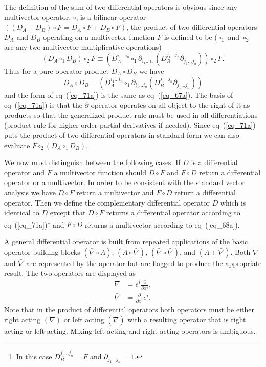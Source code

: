 \documentclass[12pt,twoside,openright]{memoir}
\newcommand{\bfrac}[2]{\displaystyle\frac{#1}{#2}}
\newcommand{\lp}{\left (}
\newcommand{\rp}{\right )}
\newcommand{\pdiff}[2]{\bfrac{\partial {#1}}{\partial {#2}}}
\newcommand{\paren}[1]{\lp {#1} \rp}
\newcommand{\be}{\begin{equation}}
\newcommand{\ee}{\end{equation}}
\begin{document}
The definition of the sum of two differential operators is obvious since any multivector operator, $\circ$, is a bilinear operator 
$\paren{\paren{D_{A}+D_{B}}\circ F = D_{A}\circ F+D_{B}\circ F}$, the product of two differential operators $D_{A}$ and $D_{B}$ operating on a multivector function $F$ is defined to be ($\circ_{1}$ and $\circ_{2}$ are any two multivector multiplicative operations)
\be
	\paren{D_{A}\circ_{1}D_{B}}\circ_{2}F \equiv \paren{D_{A}^{i_{1}\dots i_{n}}\circ_{1}
	                                              \partial_{i_{1}\dots i_{n}}\paren{D_{B}^{j_{1}\dots j_{n}}
	                                              \partial_{j_{1}\dots j_{n}}}}\circ_{2}F.
\ee
Thus for a pure operator product $D_{A}\circ D_{B}$ we have
\be\label{eq_71a}
	D_{A}\circ D_{B} = \paren{D_{A}^{i_{1}\dots i_{n}}\circ_{1}
	                                              \partial_{i_{1}\dots i_{n}}\paren{D_{B}^{j_{1}\dots j_{n}}
	                                              \partial_{j_{1}\dots j_{n}}}}
\ee
and the form of eq~(\ref{eq_71a}) is the same as eq~(\ref{eq_67a}).  The basis of eq~(\ref{eq_71a}) is that the $\partial$ operator
operates on all object to the right of it as products so that the generalized product rule must be used in all differentiations (product 
rule for higher order partial derivatives if needed).  Since eq~(\ref{eq_71a})
puts the product of two differential operators in standard form we can also evaluate $F\circ_{2}\paren{D_{A}\circ_{1}D_{B}}$.

We now must distinguish between the following cases.  If $D$ is a differential operator and $F$ a multivector function should $D\circ F$ and
$F\circ D$ return a differential operator or a multivector. In order to be consistent with the standard vector analysis we have $D\circ F$ 
return a multivector and $F\circ D$ return a differential operator.  Then we define the complementary differential operator $\bar{D}$ which
is identical to $D$ except that $\bar{D}\circ F$ returns a differential operator according to eq~(\ref{eq_71a})\footnote{In this case
$D_{B}^{j_{1}\dots j_{n}} = F$ and $\partial_{j_{1}\dots j_{n}} = 1$.} and $F\circ\bar{D}$ returns a multivector according to eq~(\ref{eq_68a}). 

A general differential operator is built from repeated applications of the basic operator building blocks $\paren{\bar{\nabla}\circ A}$,
$\paren{A\circ\bar{\nabla}}$, $\paren{\bar{\nabla}\circ\bar{\nabla}}$, and $\paren{A\pm \bar{\nabla}}$.  Both $\nabla$ and  $\bar{\nabla}$
are represented by the operator but are flagged to produce the appropriate result.  The two operators are displayed as
\begin{align}
	\nabla  &= e^{i}\pdiff{}{x^{i}}, \\
	\bar{\nabla}  &= \pdiff{}{x^{i}}e^{i}.	
\end{align}
 Note that in the product of differential operators both operators must be either right
acting $\paren{\nabla}$ or left acting $\paren{\bar{\nabla}}$ with a resulting operator that is right acting or left acting.  Mixing 
left acting and right acting operators is ambiguous.
\end{document}
